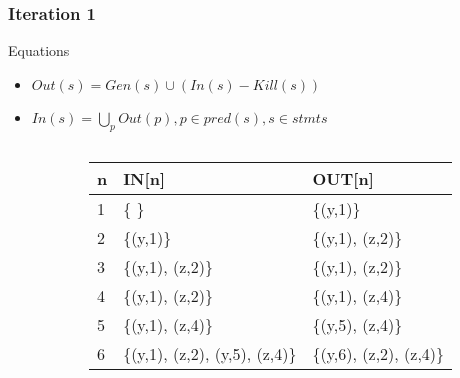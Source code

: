 \begin{frame}[fragile, t]
 \frametitle{Iteration 1} 

\begin{center}
\begin{scriptsize}
\begin{minipage}{8cm}
    \begin{block}{Equations}
    \begin{itemize}
        \item $Out(s) = Gen(s) \cup (In(s) - Kill(s))$  
	    \item $In(s) = \bigcup_p Out(p), p \in pred(s), s \in stmts$
    \end{itemize}
    \end{block}
\end{minipage}
\end{scriptsize}
\end{center}

\begin{columns}[T]
\begin{column}[T]{.4\textwidth}
    \vspace{0pt}
    
    \end{column}
    \begin{column}[T]{.6\textwidth}
\vspace{30pt}    
	\begin{scriptsize}
	   \begin{table}[]
\begin{tabular}{|l|l|l|}
\hline
n & IN{[}n{]} & OUT{[}n{]} \\ \hline
1  & \{ \} & \{(y,1)\} \pause \\ \hline
2  & \{(y,1)\} & \{(y,1), (z,2)\} \pause \\ \hline
3  & \{(y,1), (z,2)\} & \{(y,1), (z,2)\} \pause \\ \hline
4  & \{(y,1), (z,2)\} & \{(y,1), (z,4)\} \pause \\ \hline
5  & \{(y,1), (z,4)\} & \{(y,5), (z,4)\} \pause \\ \hline
6  & \{(y,1), (z,2), (y,5), (z,4)\} & \{(y,6), (z,2), (z,4)\} \\ \hline
\end{tabular}
\end{table}   
	\end{scriptsize}
	\end{column}
    
\end{columns}

\end{frame}


